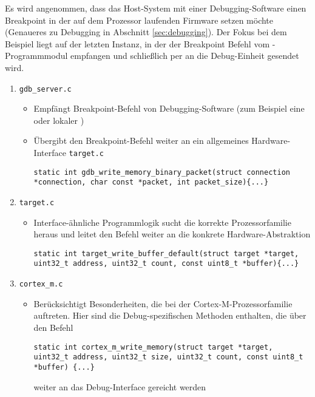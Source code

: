 	Es wird angenommen, dass das Host-System mit einer Debugging-Software einen Breakpoint in der auf dem Prozessor
	laufenden Firmware setzen möchte (Genaueres zu Debugging in Abschnitt \ref{sec:debugging}).
	Der Fokus bei dem Beispiel liegt auf der letzten Instanz, in der der Breakpoint Befehl vom -Programmmodul
	empfangen und schließlich per  an die Debug-Einheit gesendet wird.

    \begin{enumerate}
    \item \texttt{gdb\_server.c}
    \begin{itemize}
        \item Empfängt Breakpoint-Befehl von Debugging-Software (zum Beispiel eine  oder lokaler )
        \item Übergibt den Breakpoint-Befehl weiter an ein allgemeines Hardware-Interface \texttt{target.c}
        \begin{lstlisting}
static int gdb_write_memory_binary_packet(struct connection *connection, char const *packet, int packet_size){...}
        \end{lstlisting}
    \end{itemize}
     \item \texttt{target.c}
     \begin{itemize}
        \item Interface\hyp{}ähnliche Programmlogik sucht die korrekte Prozessorfamilie heraus und leitet den Befehl weiter
        an die konkrete Hardware\hyp{}Abstraktion
        \begin{lstlisting}
static int target_write_buffer_default(struct target *target, uint32_t address, uint32_t count, const uint8_t *buffer){...}
        \end{lstlisting}
     \end{itemize}
     \item \texttt{cortex\_m.c}
     \begin{itemize}
        \item Berücksichtigt Besonderheiten, die bei der Cortex-M-Prozessorfamilie auftreten. Hier sind die
        Debug-spezifischen Methoden enthalten, die über den Befehl
        \begin{lstlisting}
static int cortex_m_write_memory(struct target *target, uint32_t address, uint32_t size, uint32_t count, const uint8_t *buffer) {...}
        \end{lstlisting}
        weiter an das Debug-Interface gereicht werden

\end{itemize}
\end{enumerate}
